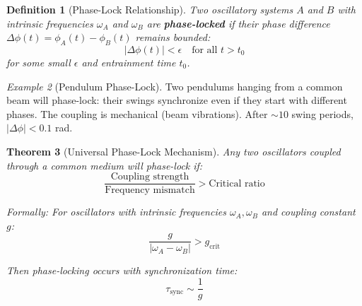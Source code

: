 \documentclass[11pt]{article}
\newtheorem{theorem}{Theorem}[section]
\newtheorem{definition}[theorem]{Definition}
\theoremstyle{remark}
\newtheorem{example}[theorem]{Example}
\begin{document}
\begin{definition}[Phase-Lock Relationship]
\label{def:phase_lock}
Two oscillatory systems $A$ and $B$ with intrinsic frequencies $\omega_A$ and $\omega_B$ are \textbf{phase-locked} if their phase difference $\Delta\phi(t) = \phi_A(t) - \phi_B(t)$ remains bounded:
\begin{equation}
|\Delta\phi(t)| < \epsilon \quad \text{for all } t > t_0
\end{equation}
for some small $\epsilon$ and entrainment time $t_0$.
\end{definition}

\begin{example}[Pendulum Phase-Lock]
Two pendulums hanging from a common beam will phase-lock: their swings synchronize even if they start with different phases. The coupling is mechanical (beam vibrations). After $\sim 10$ swing periods, $|\Delta\phi| < 0.1$ rad.
\end{example}

\begin{theorem}[Universal Phase-Lock Mechanism]
\label{thm:universal_phase_lock}
Any two oscillators coupled through a common medium will phase-lock if:
\begin{equation}
\frac{\text{Coupling strength}}{\text{Frequency mismatch}} > \text{Critical ratio}
\end{equation}

Formally: For oscillators with intrinsic frequencies $\omega_A, \omega_B$ and coupling constant $g$:
\begin{equation}
\frac{g}{|\omega_A - \omega_B|} > g_{\text{crit}}
\end{equation}

Then phase-locking occurs with synchronization time:
\begin{equation}
\tau_{\text{sync}} \sim \frac{1}{g}
\end{equation}
\end{theorem}
\end{document}
